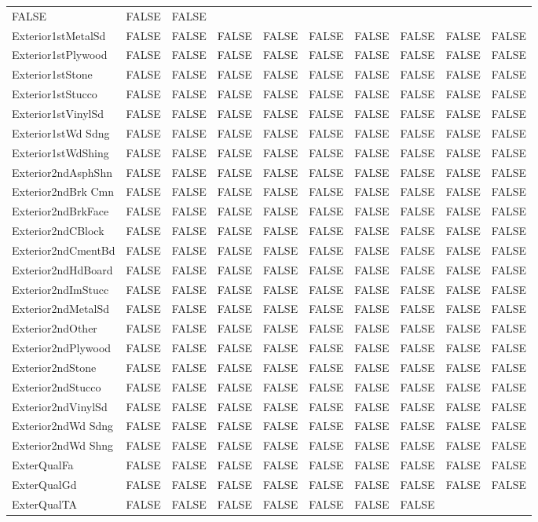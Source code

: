\documentclass[]{article}
\begin{document}
\begin{longtable}[]{@{}llllllllll@{}}
FALSE & FALSE & FALSE\tabularnewline
Exterior1stMetalSd & FALSE & FALSE & FALSE & FALSE & FALSE & FALSE &
FALSE & FALSE & FALSE\tabularnewline
Exterior1stPlywood & FALSE & FALSE & FALSE & FALSE & FALSE & FALSE &
FALSE & FALSE & FALSE\tabularnewline
Exterior1stStone & FALSE & FALSE & FALSE & FALSE & FALSE & FALSE & FALSE
& FALSE & FALSE\tabularnewline
Exterior1stStucco & FALSE & FALSE & FALSE & FALSE & FALSE & FALSE &
FALSE & FALSE & FALSE\tabularnewline
Exterior1stVinylSd & FALSE & FALSE & FALSE & FALSE & FALSE & FALSE &
FALSE & FALSE & FALSE\tabularnewline
Exterior1stWd Sdng & FALSE & FALSE & FALSE & FALSE & FALSE & FALSE &
FALSE & FALSE & FALSE\tabularnewline
Exterior1stWdShing & FALSE & FALSE & FALSE & FALSE & FALSE & FALSE &
FALSE & FALSE & FALSE\tabularnewline
Exterior2ndAsphShn & FALSE & FALSE & FALSE & FALSE & FALSE & FALSE &
FALSE & FALSE & FALSE\tabularnewline
Exterior2ndBrk Cmn & FALSE & FALSE & FALSE & FALSE & FALSE & FALSE &
FALSE & FALSE & FALSE\tabularnewline
Exterior2ndBrkFace & FALSE & FALSE & FALSE & FALSE & FALSE & FALSE &
FALSE & FALSE & FALSE\tabularnewline
Exterior2ndCBlock & FALSE & FALSE & FALSE & FALSE & FALSE & FALSE &
FALSE & FALSE & FALSE\tabularnewline
Exterior2ndCmentBd & FALSE & FALSE & FALSE & FALSE & FALSE & FALSE &
FALSE & FALSE & FALSE\tabularnewline
Exterior2ndHdBoard & FALSE & FALSE & FALSE & FALSE & FALSE & FALSE &
FALSE & FALSE & FALSE\tabularnewline
Exterior2ndImStucc & FALSE & FALSE & FALSE & FALSE & FALSE & FALSE &
FALSE & FALSE & FALSE\tabularnewline
Exterior2ndMetalSd & FALSE & FALSE & FALSE & FALSE & FALSE & FALSE &
FALSE & FALSE & FALSE\tabularnewline
Exterior2ndOther & FALSE & FALSE & FALSE & FALSE & FALSE & FALSE & FALSE
& FALSE & FALSE\tabularnewline
Exterior2ndPlywood & FALSE & FALSE & FALSE & FALSE & FALSE & FALSE &
FALSE & FALSE & FALSE\tabularnewline
Exterior2ndStone & FALSE & FALSE & FALSE & FALSE & FALSE & FALSE & FALSE
& FALSE & FALSE\tabularnewline
Exterior2ndStucco & FALSE & FALSE & FALSE & FALSE & FALSE & FALSE &
FALSE & FALSE & FALSE\tabularnewline
Exterior2ndVinylSd & FALSE & FALSE & FALSE & FALSE & FALSE & FALSE &
FALSE & FALSE & FALSE\tabularnewline
Exterior2ndWd Sdng & FALSE & FALSE & FALSE & FALSE & FALSE & FALSE &
FALSE & FALSE & FALSE\tabularnewline
Exterior2ndWd Shng & FALSE & FALSE & FALSE & FALSE & FALSE & FALSE &
FALSE & FALSE & FALSE\tabularnewline
ExterQualFa & FALSE & FALSE & FALSE & FALSE & FALSE & FALSE & FALSE &
FALSE & FALSE\tabularnewline
ExterQualGd & FALSE & FALSE & FALSE & FALSE & FALSE & FALSE & FALSE &
FALSE & FALSE\tabularnewline
ExterQualTA & FALSE & FALSE & FALSE & FALSE & FALSE & FALSE & FALSE &

\end{longtable}
\end{document}
